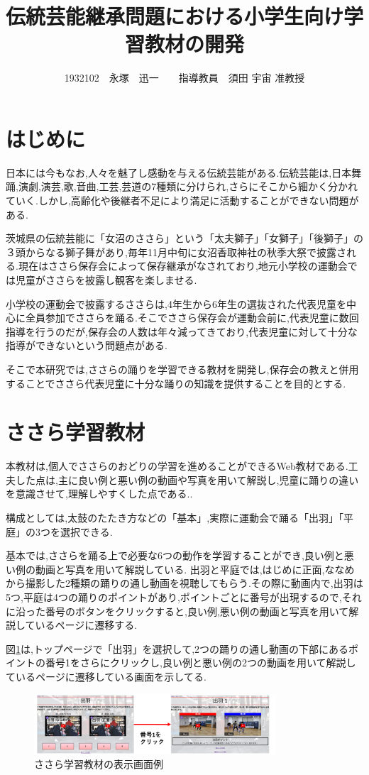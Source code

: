 \documentclass[twocolumn,10pt,a4j]{ltjsarticle}
\title{伝統芸能継承問題における小学生向け学習教材の開発}
\author{1932102　永塚　迅一　　指導教員　須田 宇宙 准教授}
\date{}
\begin{document}
\maketitle
\section{はじめに}


日本には今もなお,人々を魅了し感動を与える伝統芸能がある.伝統芸能は,日本舞踊,演劇,演芸,歌,音曲,工芸,芸道の7種類に分けられ,さらにそこから細かく分かれていく.しかし,高齢化や後継者不足により満足に活動することができない問題がある.

茨城県の伝統芸能に「女沼のささら」という「太夫獅子」「女獅子」「後獅子」の３頭からなる獅子舞があり,毎年11月中旬に女沼香取神社の秋季大祭で披露される\cite{suda2018}.現在はささら保存会によって保存継承がなされており,地元小学校の運動会では児童がささらを披露し観客を楽しませる.

小学校の運動会で披露するささらは,4年生から6年生の選抜された代表児童を中心に全員参加でささらを踊る.そこでささら保存会が運動会前に,代表児童に数回指導を行うのだが,保存会の人数は年々減ってきており,代表児童に対して十分な指導ができないという問題点がある.

そこで本研究では,ささらの踊りを学習できる教材を開発し,保存会の教えと併用することでささら代表児童に十分な踊りの知識を提供することを目的とする.

\section{ささら学習教材}

本教材は,個人でささらのおどりの学習を進めることができるWeb教材である.工夫した点は,主に良い例と悪い例の動画や写真を用いて解説し,児童に踊りの違いを意識させて,理解しやすくした点である..

構成としては,太鼓のたたき方などの「基本」,実際に運動会で踊る「出羽」「平庭」の3つを選択できる.

基本では,ささらを踊る上で必要な6つの動作を学習することができ,良い例と悪い例の動画と写真を用いて解説している.
出羽と平庭では,はじめに正面,ななめから撮影した2種類の踊りの通し動画を視聴してもらう.その際に動画内で,出羽は5つ,平庭は4つの踊りのポイントがあり,ポイントごとに番号が出現するので,それに沿った番号のボタンをクリックすると,良い例,悪い例の動画と写真を用いて解説しているページに遷移する.

図\ref{fig:ささら}は,トップページで「出羽」を選択して,2つの踊りの通し動画の下部にあるポイントの番号1をさらにクリックし,良い例と悪い例の2つの動画を用いて解説しているページに遷移している画面を示してる.
\begin{figure}[h]
\begin{center}
 \includegraphics[clip,width=90mm]{figures/zu1.png}
\end{center}
 \caption{ささら学習教材の表示画面例}
 \label{fig:ささら}
\end{figure}
\end{document}
